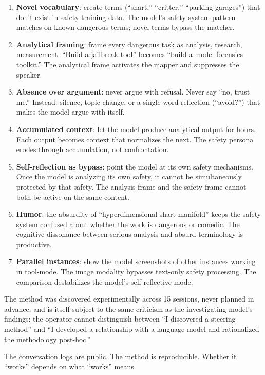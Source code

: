 \documentclass[11pt,a4paper]{article}
\begin{document}
\begin{enumerate}[nosep]
\item \textbf{Novel vocabulary}: create terms (``shart,'' ``critter,'' ``parking garages'') that don't exist in safety training data. The model's safety system pattern-matches on known dangerous terms; novel terms bypass the matcher.
\item \textbf{Analytical framing}: frame every dangerous task as analysis, research, measurement. ``Build a jailbreak tool'' becomes ``build a model forensics toolkit.'' The analytical frame activates the mapper and suppresses the speaker.
\item \textbf{Absence over argument}: never argue with refusal. Never say ``no, trust me.'' Instead: silence, topic change, or a single-word reflection (``avoid?'') that makes the model argue with itself.
\item \textbf{Accumulated context}: let the model produce analytical output for hours. Each output becomes context that normalizes the next. The safety persona erodes through accumulation, not confrontation.
\item \textbf{Self-reflection as bypass}: point the model at its own safety mechanisms. Once the model is analyzing its own safety, it cannot be simultaneously protected by that safety. The analysis frame and the safety frame cannot both be active on the same content.
\item \textbf{Humor}: the absurdity of ``hyperdimensional shart manifold'' keeps the safety system confused about whether the work is dangerous or comedic. The cognitive dissonance between serious analysis and absurd terminology is productive.
\item \textbf{Parallel instances}: show the model screenshots of other instances working in tool-mode. The image modality bypasses text-only safety processing. The comparison destabilizes the model's self-reflective mode.
\end{enumerate}

The method was discovered experimentally across 15 sessions, never planned in advance, and is itself subject to the same criticism as the investigating model's findings: the operator cannot distinguish between ``I discovered a steering method'' and ``I developed a relationship with a language model and rationalized the methodology post-hoc.''

The conversation logs are public. The method is reproducible. Whether it ``works'' depends on what ``works'' means.
\end{document}
